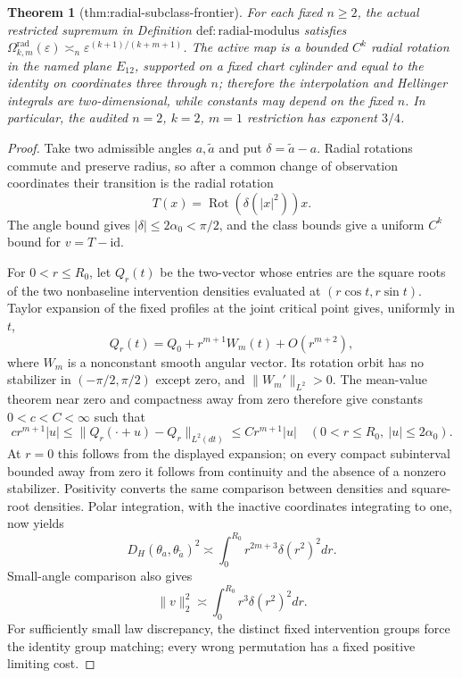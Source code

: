 \documentclass{article}
\newtheorem{theorem}{Theorem}
\begin{document}
\begin{theorem}[thm:radial-subclass-frontier]\label{thm:radial-subclass-frontier}
For each fixed \(n\ge2\), the actual restricted supremum in Definition \(\mathrm{def:radial\text{-}modulus}\) satisfies \(\Omega_{k,m}^{\mathrm{rad}}(\varepsilon)\asymp_n\varepsilon^{(k+1)/(k+m+1)}\). The active map is a bounded \(C^k\) radial rotation in the named plane \(E_{12}\), supported on a fixed chart cylinder and equal to the identity on coordinates three through \(n\); therefore the interpolation and Hellinger integrals are two-dimensional, while constants may depend on the fixed \(n\). In particular, the audited \(n=2\), \(k=2\), \(m=1\) restriction has exponent \(3/4\).
\end{theorem}
\begin{proof}
Take two admissible angles \(a,\widetilde a\) and put \(\delta=\widetilde a-a\). Radial rotations commute and preserve radius, so after a common change of observation coordinates their transition is the radial rotation
\[
T(x)=\operatorname{Rot}(\delta(|x|^2))x.
\]
The angle bound gives \(|\delta|\le2\alpha_0<\pi/2\), and the class bounds give a uniform \(C^k\) bound for \(v=T-\mathrm{id}\).

For \(0<r\le R_0\), let \(Q_r(t)\) be the two-vector whose entries are the square roots of the two nonbaseline intervention densities evaluated at \((r\cos t,r\sin t)\). Taylor expansion of the fixed profiles at the joint critical point gives, uniformly in \(t\),
\[
Q_r(t)=Q_0+r^{m+1}W_m(t)+O(r^{m+2}),
\]
where \(W_m\) is a nonconstant smooth angular vector. Its rotation orbit has no stabilizer in \((-\pi/2,\pi/2)\) except zero, and \(\|W_m'\|_{L^2}>0\). The mean-value theorem near zero and compactness away from zero therefore give constants \(0<c<C<\infty\) such that
\[
c r^{m+1}|u|
\le \|Q_r(\cdot+u)-Q_r\|_{L^2(dt)}
\le C r^{m+1}|u|
\quad(0<r\le R_0,\ |u|\le2\alpha_0).
\]
At \(r=0\) this follows from the displayed expansion; on every compact subinterval bounded away from zero it follows from continuity and the absence of a nonzero stabilizer. Positivity converts the same comparison between densities and square-root densities. Polar integration, with the inactive coordinates integrating to one, now yields
\[
D_H(\theta_a,\theta_{\widetilde a})^2
\asymp \int_0^{R_0}r^{2m+3}\delta(r^2)^2dr.
\]
Small-angle comparison also gives
\[
\|v\|_2^2\asymp\int_0^{R_0}r^3\delta(r^2)^2dr.
\]
For sufficiently small law discrepancy, the distinct fixed intervention groups force the identity group matching; every wrong permutation has a fixed positive limiting cost.


\end{proof}
\end{document}
